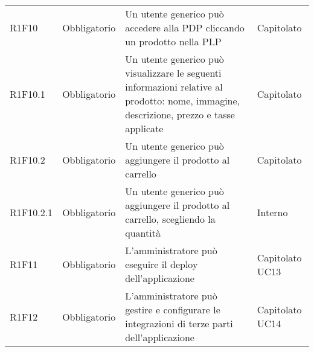 {\begin{longtable}{C{2.5cm} C{2.8cm} C{6.7cm} C{2.5cm}}

R1F10 & Obbligatorio & Un utente generico può accedere alla PDP cliccando un prodotto nella PLP & Capitolato\\
R1F10.1 & Obbligatorio & Un utente generico può visualizzare le seguenti informazioni relative al prodotto: nome, immagine, descrizione, prezzo e tasse applicate & Capitolato \\
R1F10.2 & Obbligatorio & Un utente generico può aggiungere il prodotto al carrello & Capitolato \\
R1F10.2.1 & Obbligatorio & Un utente generico può aggiungere il prodotto al carrello, scegliendo la quantità & Interno \\


R1F11 & Obbligatorio & L'amministratore può eseguire il deploy dell'applicazione & Capitolato \newline UC13\\
R1F12 & Obbligatorio & L'amministratore può gestire e configurare le integrazioni di terze parti dell'applicazione & Capitolato \newline UC14\\

\end{longtable}

}